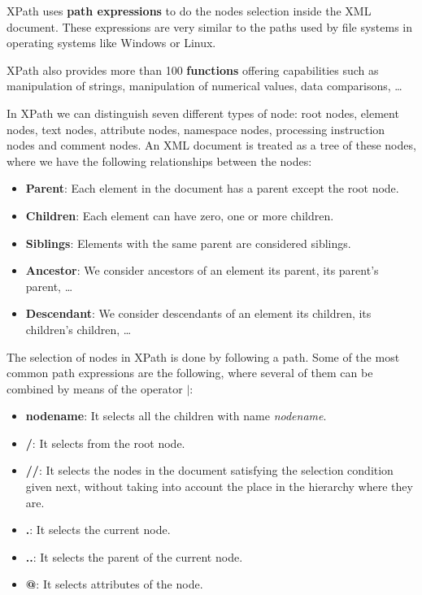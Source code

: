 XPath uses \textbf{path expressions} to do the nodes selection inside the XML document. These expressions are very similar to the paths used by file systems in operating systems like Windows or Linux.

XPath also provides more than 100 \textbf{functions} offering capabilities such as manipulation of strings, manipulation of numerical values, data comparisons, \ldots

In XPath we can distinguish seven different types of node: root nodes, element nodes, text nodes, attribute nodes, namespace nodes, processing instruction nodes and comment nodes. An XML document is treated as a tree of these nodes, where we have the following relationships between the nodes:

\begin{itemize}

\item \textbf{Parent}: Each element in the document has a parent except the root node.

\item \textbf{Children}: Each element can have zero, one or more children.

\item \textbf{Siblings}: Elements with the same parent are considered siblings.

\item \textbf{Ancestor}: We consider ancestors of an element its parent, its parent's parent, \ldots

\item \textbf{Descendant}: We consider descendants of an element its children, its children's children, \ldots

\end{itemize}

The selection of nodes in XPath is done by following a path. Some of the most common path expressions are the following, where several of them can be combined by means of the operator \textbf{$|$}:

\begin{itemize}

\item \textbf{nodename}: It selects all the children with name \textit{nodename}.

\item \textbf{/}: It selects from the root node.

\item \textbf{//}: It selects the nodes in the document satisfying the selection condition given next, without taking into account the place in the hierarchy where they are.

\item \textbf{.}: It selects the current node.

\item \textbf{..}: It selects the parent of the current node.

\item \textbf{@}: It selects attributes of the node.

\end{itemize}

